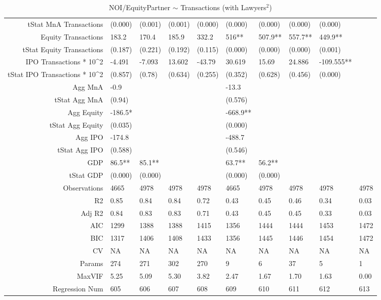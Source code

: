 \begin{table}[ht]
\begin{tabular}{rlllllllll}
  tStat MnA Transactions & (0.000) & (0.001) & (0.001) & (0.000) & (0.000) & (0.000) & (0.000) & (0.000) &  \\ 
  Equity Transactions & 183.2 & 170.4 & 185.9 & 332.2 & 516** & 507.9** & 557.7** & 449.9** &  \\ 
  tStat Equity Transactions & (0.187) & (0.221) & (0.192) & (0.115) & (0.000) & (0.000) & (0.000) & (0.001) &  \\ 
  IPO Transactions * 10^2 & -4.491 & -7.093 & 13.602 & -43.79 & 30.619 & 15.69 & 24.886 & -109.555** &  \\ 
  tStat IPO Transactions * 10^2 & (0.857) & (0.78) & (0.634) & (0.255) & (0.352) & (0.628) & (0.456) & (0.000) &  \\ 
  Agg MnA & -0.9 &  &  &  & -13.3 &  &  &  &  \\ 
  tStat Agg MnA & (0.94) &  &  &  & (0.576) &  &  &  &  \\ 
  Agg Equity & -186.5* &  &  &  & -668.9** &  &  &  &  \\ 
  tStat Agg Equity & (0.035) &  &  &  & (0.000) &  &  &  &  \\ 
  Agg IPO & -174.8 &  &  &  & -488.7 &  &  &  &  \\ 
  tStat Agg IPO & (0.588) &  &  &  & (0.546) &  &  &  &  \\ 
  GDP & 86.5** & 85.1** &  &  & 63.7** & 56.2** &  &  &  \\ 
  tStat GDP & (0.000) & (0.000) &  &  & (0.000) & (0.000) &  &  &  \\ 
  Observations & 4665 & 4978 & 4978 & 4978 & 4665 & 4978 & 4978 & 4978 & 4978 \\ 
  R2 & 0.85 & 0.84 & 0.84 & 0.72 & 0.43 & 0.45 & 0.46 & 0.34 & 0.03 \\ 
  Adj R2 & 0.84 & 0.83 & 0.83 & 0.71 & 0.43 & 0.45 & 0.45 & 0.33 & 0.03 \\ 
  AIC & 1299 & 1388 & 1388 & 1415 & 1356 & 1444 & 1444 & 1453 & 1472 \\ 
  BIC & 1317 & 1406 & 1408 & 1433 & 1356 & 1445 & 1446 & 1454 & 1472 \\ 
  CV & NA & NA & NA & NA & NA & NA & NA & NA & NA \\ 
  Params & 274 & 271 & 302 & 270 & 9 & 6 & 37 & 5 & 1 \\ 
  MaxVIF & 5.25 & 5.09 & 5.30 & 3.82 & 2.47 & 1.67 & 1.70 & 1.63 & 0.00 \\ 
  Regression Num & 605 & 606 & 607 & 608 & 609 & 610 & 611 & 612 & 613 \\ 
   \hline
\end{tabular}
\caption{NOI/EquityPartner $\sim$ Transactions (with Lawyers$^2$)} 
\end{table}
